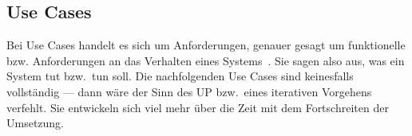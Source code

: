 
\subsection{Use Cases}
\label{subsec::requirements:use-cases}

Bei Use Cases handelt es sich um Anforderungen, genauer gesagt um funktionelle
bzw. Anforderungen an das Verhalten eines Systems~\cite{larman_applying_2004}.
Sie sagen also aus, was ein System tut bzw.\ tun soll. Die nachfolgenden Use
Cases sind keinesfalls vollständig --- dann wäre der Sinn des UP bzw.\ eines
iterativen Vorgehens verfehlt. Sie entwickeln sich viel mehr über die Zeit mit
dem Fortschreiten der Umsetzung.






